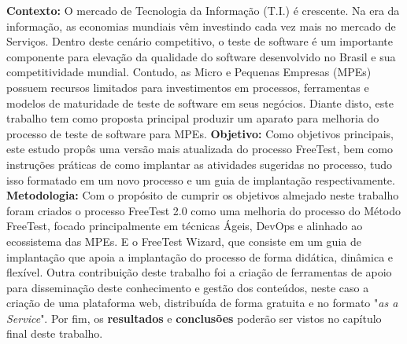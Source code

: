 
\begin{resumo} 

\textbf{Contexto:} O mercado de Tecnologia da Informação (T.I.) é crescente. Na era da informação, as economias mundiais vêm investindo cada vez mais no mercado de Serviços. Dentro deste cenário competitivo, o teste de software é um importante componente para elevação da qualidade do software desenvolvido no Brasil e sua competitividade mundial. Contudo, as Micro e Pequenas Empresas (MPEs) possuem recursos limitados para investimentos em processos, ferramentas e modelos de maturidade de teste de software em seus negócios. Diante disto, este trabalho tem como proposta principal produzir um aparato para melhoria do processo de teste de software para MPEs. \textbf{Objetivo:} Como objetivos principais, este estudo propôs uma versão mais atualizada do processo FreeTest, bem como instruções práticas de como implantar as atividades sugeridas no processo, tudo isso formatado em um novo processo e um guia de implantação respectivamente. \textbf{Metodologia:} Com o propósito de cumprir os objetivos almejado neste trabalho foram criados o processo FreeTest 2.0 como uma melhoria do processo do Método FreeTest, focado principalmente em técnicas Ágeis, DevOps e alinhado ao ecossistema das MPEs. E o FreeTest Wizard, que consiste em um guia de implantação que apoia a implantação do processo de forma didática, dinâmica e flexível. Outra contribuição deste trabalho foi a criação de ferramentas de apoio para disseminação deste conhecimento e gestão dos conteúdos, neste caso a criação de uma plataforma web, distribuída de forma gratuita e no formato "\textit{as a Service}". Por fim, os \textbf{resultados} e \textbf{conclusões} poderão ser vistos no capítulo final deste trabalho.

\end{resumo}